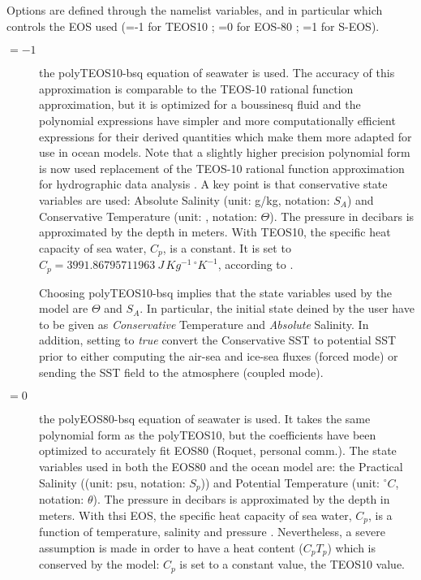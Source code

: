 \documentclass[NEMO_book]{subfiles}
\begin{document}
Options are defined through the   namelist variables, and in particular  
which controls the EOS used (=-1 for TEOS10 ; =0 for EOS-80 ; =1 for S-EOS).
\begin{description}

\item[$=-1$] the polyTEOS10-bsq equation of seawater \citep{Roquet_OM2015} is used.  
The accuracy of this approximation is comparable to the TEOS-10 rational function approximation, 
but it is optimized for a boussinesq fluid and the polynomial expressions have simpler 
and more computationally efficient expressions for their derived quantities 
which make them more adapted for use in ocean models. 
Note that a slightly higher precision polynomial form is now used replacement of the TEOS-10 
rational function approximation for hydrographic data analysis  \citep{TEOS10}. 
A key point is that conservative state variables are used: 
Absolute Salinity (unit: g/kg, notation: $S_A$) and Conservative Temperature (unit: \degC, notation: $\Theta$).
The pressure in decibars is approximated by the depth in meters. 
With TEOS10, the specific heat capacity of sea water, $C_p$, is a constant. It is set to 
$C_p=3991.86795711963~J\,Kg^{-1}\,^{\circ}K^{-1}$, according to \citet{TEOS10}.

Choosing polyTEOS10-bsq implies that the state variables used by the model are 
$\Theta$ and $S_A$. In particular, the initial state deined by the user have to be given as 
\textit{Conservative} Temperature and \textit{Absolute} Salinity. 
In addition, setting  to \textit{true} convert the Conservative SST to potential SST 
prior to either computing the air-sea and ice-sea fluxes (forced mode) 
or sending the SST field to the atmosphere (coupled mode).

\item[$=0$] the polyEOS80-bsq equation of seawater is used.
It takes the same polynomial form as the polyTEOS10, but the coefficients have been optimized 
to accurately fit EOS80 (Roquet, personal comm.). The state variables used in both the EOS80 
and the ocean model are: 
the Practical Salinity ((unit: psu, notation: $S_p$)) and Potential Temperature (unit: $^{\circ}C$, notation: $\theta$).
The pressure in decibars is approximated by the depth in meters.  
With thsi EOS, the specific heat capacity of sea water, $C_p$, is a function of temperature, 
salinity and pressure \citep{UNESCO1983}. Nevertheless, a severe assumption is made in order to 
have a heat content ($C_p T_p$) which is conserved by the model: $C_p$ is set to a constant 
value, the TEOS10 value. 
 

\end{description}
\end{document}
